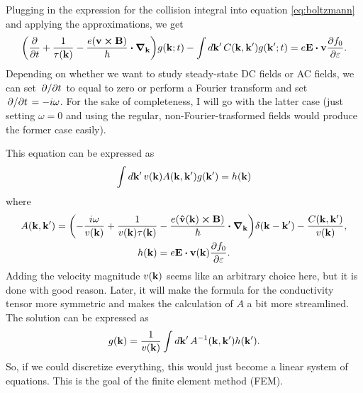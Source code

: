 \documentclass[12pt]{article}
\begin{document}
Plugging in the expression for the collision integral into equation \eqref{eq:boltzmann} and
applying the approximations, we get
\begin{equation}
    \qty(\pdv{t} + \frac{1}{\tau(\vb{k})} - \frac{e(\vb{v}\cross\vb{B})}{\hbar}\vdot\grad_{\vb{k}})
    g(\vb{k}; t) - \int\dd{\vb{k'}} C(\vb{k}, \vb{k'}) g(\vb{k'}; t)
    = e\vb{E}\vdot\vb{v}\pdv{f_0}{\varepsilon}.
\end{equation}
Depending on whether we want to study steady-state DC fields or AC fields, we can set $\pdv*{t}$ to
equal to zero or perform a Fourier transform and set $\pdv*{t} = -i\omega$. For the sake of
completeness, I will go with the latter case (just setting $\omega=0$ and using the regular,
non-Fourier-trasformed fields would produce the former case easily).

This equation can be expressed as
\begin{equation}
    \int \dd{\vb{k'}} v(\vb{k}) A(\vb{k}, \vb{k'}) g(\vb{k'}) = h(\vb{k})
    \label{eq:integral_equation}
\end{equation}
where
\begin{gather}
    A(\vb{k}, \vb{k'}) = \qty(-\frac{i\omega}{v(\vb{k})} + \frac{1}{v(\vb{k})\tau(\vb{k})}
        - \frac{e\qty(\vu{v}(\vb{k})\cross\vb{B})}{\hbar}\vdot\grad_{\vb{k}})\delta(\vb{k}-\vb{k'})
        - \frac{C(\vb{k},\vb{k'})}{v(\vb{k})}, \label{eq:operator} \\
    h(\vb{k}) = e\vb{E}\vdot\vb{v}(\vb{k})\pdv{f_0}{\varepsilon}.
\end{gather}
Adding the velocity magnitude $v(\vb{k})$ seems like an arbitrary choice here, but it is done with
good reason. Later, it will make the formula for the conductivity tensor more symmetric and makes
the calculation of $A$ a bit more streamlined. The solution can be expressed as
\begin{equation}
    g(\vb{k}) = \frac{1}{v(\vb{k})} \int\dd{\vb{k'}} A^{-1}(\vb{k}, \vb{k'}) h(\vb{k'}).
\end{equation}
So, if we could discretize everything, this would just become a linear system of equations. This is
the goal of the finite element method (FEM).
\end{document}
